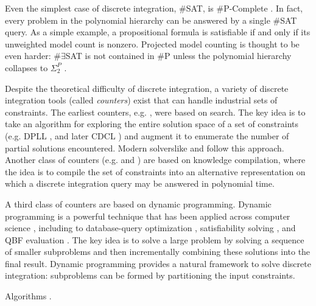 Even the simplest case of discrete integration, \#SAT, is \#P-Complete \cite{Valiant79}. 
In fact, every problem in the polynomial hierarchy can be answered by a single \#SAT query. %
As a simple example, a propositional formula is satisfiable if and only if its unweighted model count is nonzero.
Projected model counting is thought to be even harder: $\#\exists$SAT is not contained in $\#$P unless the polynomial hierarchy collapses to $\Sigma_2^P$ \cite{zawadzki2013generalization}.

Despite the theoretical difficulty of discrete integration, a variety of discrete integration tools (called \emph{counters}) exist that can handle industrial sets of constraints. The earliest counters, e.g.  \cite{birnbaum1999good}, were based on search.
The key idea is to take an algorithm for exploring the entire solution space of a set of constraints (e.g. DPLL \cite{davis1960computing,davis1962machine}, and later CDCL \cite{biere2009conflict}) and augment it to enumerate the number of partial solutions encountered. 
Modern solverslike  \cite{SBK05} and  \cite{Thurley2006} follow this approach.
Another class of counters (e.g.  \cite{OD15} and  \cite{LM17}) are based on knowledge compilation, where the idea is to compile the set of constraints into an alternative representation on which a discrete integration query may be answered in polynomial time.

A third class of counters \cite{CW16,FHMW17,FHWZ18,FHZ19,DPV20,fichte2020exploiting} are based on dynamic programming. %
Dynamic programming is a powerful technique that has been applied across computer science \cite{bellman1966dynamic}, including to database-query optimization \cite{MPPV04}, satisfiability solving \cite{uribe1994ordered,aguirre2001random,pan2005symbolic}, and QBF evaluation \cite{charwat2016bdd}.
The key idea is to solve a large problem by solving a sequence of smaller subproblems and then incrementally combining these solutions into the final result.
Dynamic programming provides a natural framework to solve discrete integration: subproblems can be formed by partitioning the input constraints.


Algorithms \cite{FMR08,SS10}.





